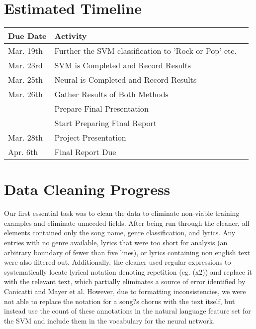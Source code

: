 \documentclass[journal]{IEEEtran}
\begin{document}
\section{Estimated Timeline}

\begin{table}[h!]
  \begin{center}
    \label{tab:table1}
    \begin{tabular}{l|l|l|}
      \textbf{Due Date} & \textbf{Activity}\\

      \hline

Mar. 19th & Further the SVM classification to 'Rock or Pop' etc.\\
Mar. 	23rd & SVM is Completed and Record Results \\
Mar. 	25th & Neural is Completed and Record Results \\
Mar. 	26th & Gather Results of Both Methods \\
		&Prepare Final Presentation \\
		& Start Preparing Final Report \\
Mar. 	28th & Project Presentation\\
Apr. 	6th & Final Report Due\\

    \end{tabular}
  \end{center}
\end{table}


\section{Data Cleaning Progress}

Our first essential task was to clean the data to eliminate non-viable training examples and eliminate unneeded fields. After being run through the cleaner, all elements contained only the song name, genre classification, and lyrics. Any entries with no genre available, lyrics that were too short for analysis (an arbitrary boundary of fewer than five lines), or lyrics containing non english text were also filtered out. Additionally, the cleaner used regular expressions to systematically locate lyrical notation denoting repetition (eg. (x2)) and replace it with the relevant text, which partially eliminates a source of error identified by Canicatti and Mayer et al. However, due to formatting inconsistencies, we were not able to replace the notation for a song?s chorus with the text itself, but instead use the count of these annotations in the natural language feature set for the SVM and include them in the vocabulary for the neural network.
\end{document}
